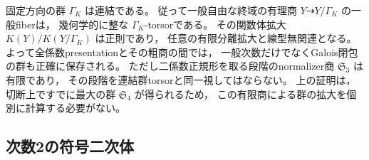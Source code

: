 \begin{remark}[連結な座標群による別の確認]
固定方向の群 $\Gamma_K$ は連結である。
従って一般自由な終域の有理商 $Y\dashrightarrow Y/\Gamma_K$ の一般fiberは，
幾何学的に整な $\Gamma_K$-torsorである。
その関数体拡大 $K(Y)/K(Y/\Gamma_K)$ は正則であり，
任意の有限分離拡大と線型無関連となる。
よって全係数presentationとその粗商の間では，
一般次数だけでなくGalois閉包の群も正確に保存される。
ただし二係数正規形を取る段階のnormalizer商 $\mathfrak S_3$ は有限であり，
その段階を連結群torsorと同一視してはならない。
上の証明は，切断上ですでに最大の群 $\mathfrak S_4$ が得られるため，
この有限商による群の拡大を個別に計算する必要がない。
\end{remark}

\subsection{次数2の符号二次体}

